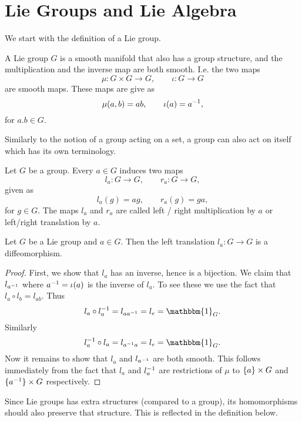 \chapter{Lie Groups and Lie Algebra}

We start with the definition of a Lie group.

\begin{definition}
	A Lie group $ G $ is a smooth manifold that also has a group structure, and the multiplication and the inverse map are both smooth. I.e. the two maps
	\[ \mu: G\times G \to G, \qquad \iota: G\to G \]
	are smooth maps. These maps are give as
	\[ \mu(a,b) = ab, \qquad \iota(a) = a^{-1}, \]
	for $ a.b \in G $.
\end{definition}

Similarly to the notion of a group acting on a set, a group can also act on itself which has its own terminology.

\begin{definition}[Translation]
	Let $ G $ be a group. Every $ a\in G $ induces two maps
	\[ l_a : G\to G, \qquad r_a : G \to G, \]
	given as
	\[ l_a(g) = ag, \qquad r_a(g) = ga, \]
	for $ g \in G $.
	The maps $ l_a $ and $ r_a $ are called left / right multiplication by $ a $ or left/right translation by $ a $.
\end{definition}

\begin{proposition}
	Let $ G $ be a Lie group and $ a \in G $. Then the left translation $ l_a: G\to G $ is a diffeomorphism.
\end{proposition}
\begin{proof}
	First, we show that $ l_a $ has an inverse, hence is a bijection. We claim that $ l_{a^{-1}} $ where $ a^{-1} = \iota(a) $ is the inverse of $ l_a $. To see these we use the fact that $ l_a \circ l_b = l_{ab} $. Thus
	\[ l_a \circ l_\inv{a} = l_{a\inv{a}} = l_e = \mathbbm{1}_G. \]
	Similarly
	\[ l_\inv{a} \circ l_a = l_{\inv{a} a} = l_e = \mathbbm{1}_G. \]
	Now it remains to show that $ l_{a} $ and $ l_{a^{-1}} $ are both smooth. This follows immediately from the fact that $ l_{a} $ and $ l_a^{-1} $ are restrictions of $ \mu $ to $ \{a\}\times G $ and $ \{a^{-1}\}\times G $ respectively.
\end{proof}

Since Lie groups has extra structures (compared to a group), its homomorphisms should also preserve that structure. This is reflected in the definition below.

